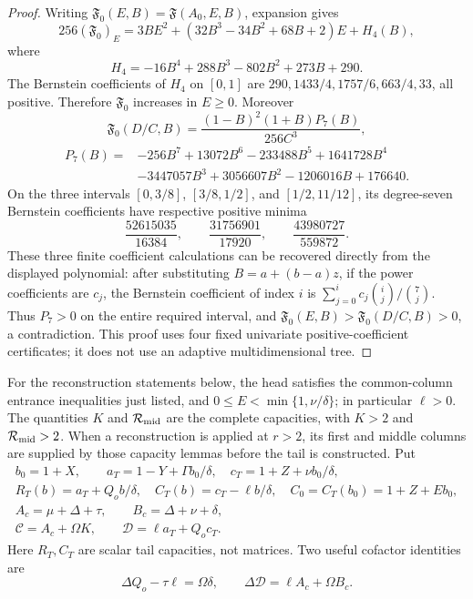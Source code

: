 \documentclass[11pt,reqno]{amsart}
\theoremstyle{definition}
\theoremstyle{remark}
\begin{document}
\begin{proof}
Writing \(\mathfrak F_0(E,B)=\mathfrak F(A_0,E,B)\), expansion gives
\[
 256(\mathfrak F_0)_E
 =3BE^2+(32B^3-34B^2+68B+2)E+H_4(B),
\]
where
\[
 H_4=-16B^4+288B^3-802B^2+273B+290.
\]
The Bernstein coefficients of \(H_4\) on \([0,1]\) are
\(290,1433/4,1757/6,663/4,33\), all positive. Therefore
\(\mathfrak F_0\) increases in \(E\ge0\). Moreover
\[
 \mathfrak F_0(D/C,B)=\frac{(1-B)^2(1+B)P_7(B)}{256C^3},
\]
\[
\begin{split}
 P_7(B)={}&-256B^7+13072B^6-233488B^5+1641728B^4\\
 &-3447057B^3+3056607B^2-1206016B+176640.
\end{split}
\]
On the three intervals \([0,3/8]\), \([3/8,1/2]\), and
\([1/2,11/12]\), its degree-seven Bernstein coefficients have
respective positive minima
\[
 \frac{52615035}{16384},\qquad
 \frac{31756901}{17920},\qquad
 \frac{43980727}{559872}.
\]
These three finite coefficient calculations can be recovered directly
from the displayed polynomial: after substituting \(B=a+(b-a)z\),
if the power coefficients are \(c_j\), the Bernstein coefficient of
index \(i\) is
\(\sum_{j=0}^i c_j\binom{i}{j}/\binom7j\).
Thus \(P_7>0\) on the entire required interval, and
\(\mathfrak F_0(E,B)>\mathfrak F_0(D/C,B)>0\), a contradiction.
This proof uses four fixed univariate positive-coefficient certificates;
it does not use an adaptive multidimensional tree.
\end{proof}

For the reconstruction statements below, the head satisfies the
common-column entrance inequalities just listed, and
\(0\le E<\min\{1,\nu/\delta\}\); in particular \(\ell>0\).
The quantities \(K\) and \(\mathcal R_{\rm mid}\) are the complete
capacities, with \(K>2\) and \(\mathcal R_{\rm mid}>2\).
When a reconstruction is applied at \(r>2\), its first and middle
columns are supplied by those capacity lemmas before the tail is
constructed. Put
\begin{equation}\label{s3:wall-tail-functions}
\begin{gathered}
 b_0=1+X,\qquad
 a_T=1-Y+\Gamma b_0/\delta,\quad
 c_T=1+Z+\nu b_0/\delta,\\
 R_T(b)=a_T+Q_ob/\delta,\quad
 C_T(b)=c_T-\ell b/\delta,\quad
 C_0=C_T(b_0)=1+Z+Eb_0,\\
 A_c=\mu+\Delta+\tau,\qquad B_c=\Delta+\nu+\delta,\\
 \mathcal C=A_c+\Omega K,\qquad
 \mathcal D=\ell a_T+Q_oc_T.
\end{gathered}
\end{equation}
Here \(R_T,C_T\) are scalar tail capacities, not matrices.
Two useful cofactor identities are
\[
 \Delta Q_o-\tau\ell=\Omega\delta,\qquad
 \Delta\mathcal D=\ell A_c+\Omega B_c.
\]
\end{document}
